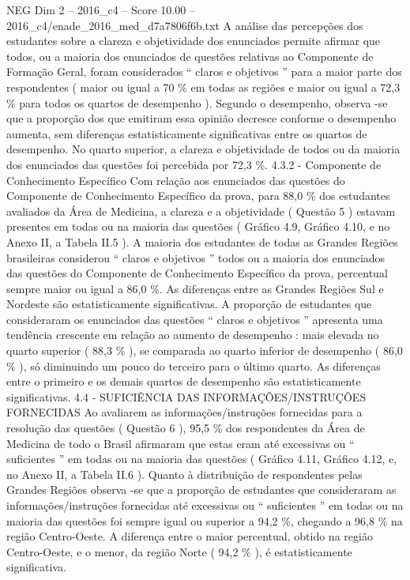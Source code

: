 \begin{textsample}{NEG Dim 2 – 2016\_c4 – Score 10.00 – 2016\_c4/enade\_2016\_med\_d7a7806f6b.txt}
A análise das percepções dos estudantes sobre a clareza e objetividade dos enunciados permite afirmar que todos, ou a maioria dos enunciados de questões relativas ao Componente de Formação Geral, foram considerados “ claros e objetivos ” para a maior parte dos respondentes ( maior ou igual a 70 \% em todas as regiões e maior ou igual a 72,3 \% para todos os quartos de desempenho ).
Segundo o desempenho, observa -se que a proporção dos que emitiram essa opinião decresce conforme o desempenho aumenta, sem diferenças estatisticamente significativas entre os quartos de desempenho.
No quarto superior, a clareza e objetividade de todos ou da maioria dos enunciados das questões foi percebida por 72,3 \%. 4.3.2 - Componente de Conhecimento Específico Com relação aos enunciados das questões do Componente de Conhecimento Específico da prova, para 88,0 \% dos estudantes avaliados da Área de Medicina, a clareza e a objetividade ( Questão 5 ) estavam presentes em todas ou na maioria das questões ( Gráfico 4.9, Gráfico 4.10, e no Anexo II, a Tabela II.5 ).
A maioria dos estudantes de todas as Grandes Regiões brasileiras considerou “ claros e objetivos ” todos ou a maioria dos enunciados das questões do Componente de Conhecimento Específico da prova, percentual sempre maior ou igual a 86,0 \%.
As diferenças entre as Grandes Regiões Sul e Nordeste são estatisticamente significativas.
A proporção de estudantes que consideraram os enunciados das questões “ claros e objetivos ” apresenta uma tendência crescente em relação ao aumento de desempenho : mais elevada no quarto superior ( 88,3 \% ), se comparada ao quarto inferior de desempenho ( 86,0 \% ), só diminuindo um pouco do terceiro para o último quarto.
As diferenças entre o primeiro e os demais quartos de desempenho são estatisticamente significativas. 4.4 - SUFICIÊNCIA DAS INFORMAÇÕES/INSTRUÇÕES FORNECIDAS Ao avaliarem as informações/instruções fornecidas para a resolução das questões ( Questão 6 ), 95,5 \% dos respondentes da Área de Medicina de todo o Brasil afirmaram que estas eram até excessivas ou “ suficientes ” em todas ou na maioria das questões ( Gráfico 4.11, Gráfico 4.12, e, no Anexo II, a Tabela II.6 ).
Quanto à distribuição de respondentes pelas Grandes Regiões observa -se que a proporção de estudantes que consideraram as informações/instruções fornecidas até excessivas ou “ suficientes ” em todas ou na maioria das questões foi sempre igual ou superior a 94,2 \%, chegando a 96,8 \% na região Centro-Oeste.
A diferença entre o maior percentual, obtido na região Centro-Oeste, e o menor, da região Norte ( 94,2 \% ), é estatisticamente significativa.

\end{textsample}
